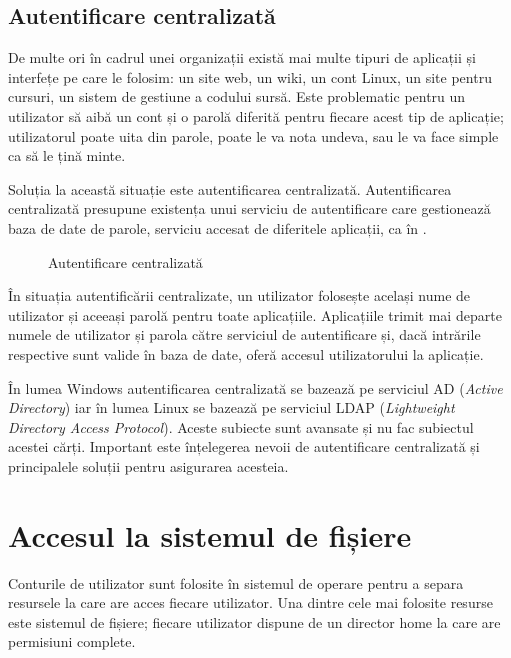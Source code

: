 \subsection{Autentificare centralizată}
\label{sec:user:centralized-auth}

De multe ori în cadrul unei organizații există mai multe tipuri de aplicații și
interfețe pe care le folosim: un site web, un wiki, un cont Linux, un site
pentru cursuri, un sistem de gestiune a codului sursă. Este problematic pentru
un utilizator să aibă un cont și o parolă diferită pentru fiecare acest tip de
aplicație; utilizatorul poate uita din parole, poate le va nota undeva, sau le
va face simple ca să le țină minte.

Soluția la această situație este autentificarea centralizată. Autentificarea
centralizată presupune existența unui serviciu de autentificare care gestionează
baza de date de parole, serviciu accesat de diferitele aplicații, ca în .

\begin{figure}[htbp]
	\centering
	\def\svgwidth{0.7\columnwidth}
	
        \caption{Autentificare centralizată}
        \label{fig:user:centralized-auth}
\end{figure}

În situația autentificării centralizate, un utilizator folosește același nume de
utilizator și aceeași parolă pentru toate aplicațiile. Aplicațiile trimit mai
departe numele de utilizator și parola către serviciul de autentificare și, dacă
intrările respective sunt valide în baza de date, oferă accesul utilizatorului
la aplicație.

În lumea Windows autentificarea centralizată se bazează pe serviciul AD
 (\textit{Active Directory}) iar în lumea Linux se bazează
pe serviciul LDAP 
(\textit{Lightweight Directory Access Protocol}). Aceste subiecte sunt avansate și nu fac
subiectul acestei cărți. Important este înțelegerea nevoii de autentificare
centralizată și principalele soluții pentru asigurarea acesteia.

\section{Accesul la sistemul de fișiere}
\label{sec:user:fs-access}

Conturile de utilizator sunt folosite în sistemul de operare pentru a separa
resursele la care are acces fiecare utilizator. Una dintre cele mai folosite resurse
este sistemul de fișiere; fiecare utilizator dispune de un director home la care
are permisiuni complete.

